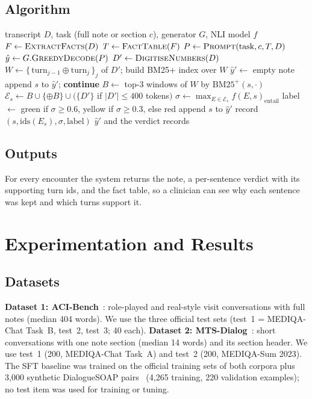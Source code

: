 \documentclass[conference]{IEEEtran}
\begin{document}
\subsection{Algorithm}
\begin{algorithm}[t]
\caption{FaCTS note generation}\label{alg:facts}
\begin{algorithmic}[1]
\Require transcript $D$, task (full note or section $c$), generator $G$, NLI model $f$
\State $F \gets \textsc{ExtractFacts}(D)$ 
\State $T \gets \textsc{FactTable}(F)$ 
\State $P \gets \textsc{Prompt}(\text{task}, c, T, D)$
\State $\hat{y} \gets G.\textsc{GreedyDecode}(P)$
\State $D' \gets \textsc{DigitiseNumbers}(D)$
\State $W \gets \{\,\text{turn}_{j-1} \oplus \text{turn}_j\,\}_{j}$ of $D'$; build BM25+ index over $W$
\State $\hat{y}' \gets$ empty note
   append $s$ to $\hat{y}'$; \textbf{continue} \EndIf
  \State $B \gets$ top-3 windows of $W$ by $\mathrm{BM25^{+}}(s,\cdot)$
  \State $\mathcal{E}_s \gets B \cup \{\oplus B\} \cup (\{D'\}$ if $|D'|\le400$ tokens$)$
  \State $\sigma \gets \max_{E\in\mathcal{E}_s} f(E, s)_{\text{entail}}$
  \State label $\gets$ green if $\sigma\ge0.6$, yellow if $\sigma\ge0.3$, else red
   append $s$ to $\hat{y}'$ \EndIf
  \State record $(s, \text{ids}(E_s), \sigma, \text{label})$
\EndFor
\State \Return $\hat{y}'$ and the verdict records
\end{algorithmic}
\end{algorithm}

\subsection{Outputs}
For every encounter the system returns the note, a per-sentence verdict with its supporting turn ids, and the
fact table, so a clinician can see why each sentence was kept and which turns support it.

\section{Experimentation and Results}\label{sec:exp}

\subsection{Datasets}
\textbf{Dataset 1: ACI-Bench}~\cite{yim2023aci}: role-played and real-style visit conversations with full
notes (median 404 words). We use the three official test sets (test~1 = MEDIQA-Chat Task~B, test~2, test~3;
40 each). \textbf{Dataset 2: MTS-Dialog}~\cite{abacha2023mts}: short conversations with one note section
(median 14 words) and its section header. We use test~1 (200, MEDIQA-Chat Task~A) and test~2 (200, MEDIQA-Sum
2023). The SFT baseline was trained on the official training sets of both corpora plus 3,000 synthetic
DialogueSOAP pairs~\cite{omi2024soap} (4,265 training, 220 validation examples); no test item was used for
training or tuning.
\end{document}
